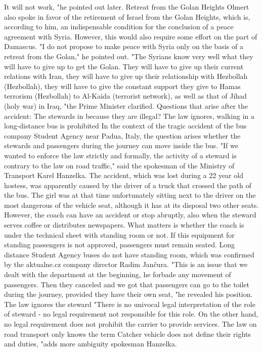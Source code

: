 It will not work, "he pointed out later.
Retreat from the Golan Heights
Olmert also spoke in favor of the retirement of Israel from the Golan Heights, which is, according to him, an indispensable condition for the conclusion of a peace agreement with Syria.
However, this would also require some effort on the part of Damascus.
"I do not propose to make peace with Syria only on the basis of a retreat from the Golan," he pointed out.
"The Syrians know very well what they will have to give up to get the Golan.
They will have to give up their current relations with Iran, they will have to give up their relationship with Hezbollah (Hezbollah), they will have to give the constant support they give to Hamas terrorism (Hezbollah) to Al-Kaida (terrorist network), as well as that of Jihad (holy war) in Iraq, "the Prime Minister clarified.
Questions that arise after the accident: The stewards in because they are illegal?
The law ignores, walking in a long-distance bus is prohibited
In the context of the tragic accident of the bus company Student Agency near Padua, Italy, the question arises whether the stewards and passengers during the journey can move inside the bus.
"If we wanted to enforce the law strictly and formally, the activity of a steward is contrary to the law on road traffic," said the spokesman of the Ministry of Transport Karel Hanzelka.
The accident, which was lost during a 22 year old hostess, was apparently caused by the driver of a truck that crossed the path of the bus.
The girl was at that time unfortunately sitting next to the driver on the most dangerous of the vehicle seat, although it has at its disposal two other seats.
However, the coach can have an accident or stop abruptly, also when the steward serves coffee or distributes newspapers.
What matters is whether the coach is under the technical sheet with standing room or not.
If this equipment for standing passengers is not approved, passengers must remain seated.
Long distance Student Agency buses do not have standing room, which was confirmed by the aktualne.cz company director Radim Jančura.
"This is an issue that we dealt with the department at the beginning, he forbade any movement of passengers.
Then they canceled and we got that passengers can go to the toilet during the journey, provided they have their own seat, "he revealed his position.
The law ignores the steward
"There is no univocal legal interpretation of the role of steward - no legal requirement not responsible for this role.
On the other hand, no legal requirement does not prohibit the carrier to provide services.
The law on road transport only knows the term Catcher vehicle does not define their rights and duties, "adds more ambiguity spokesman Hanzelka.
